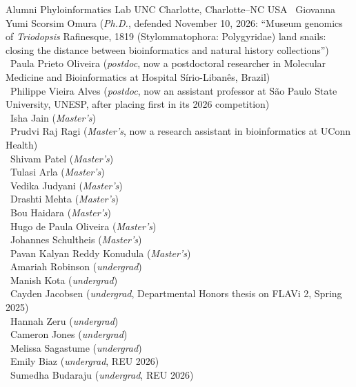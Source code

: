 \documentclass[11pt, letterpaper, sans]{moderncv}
\begin{document}
    {Alumni}
    {Phyloinformatics Lab}
    {UNC Charlotte, Charlotte--NC}
    {USA}
        {
            \textbullet~Giovanna Yumi Scorsim Omura (\textit{Ph.D.}, defended November 10, 2026: ``Museum genomics of \textit{Triodopsis} Rafinesque, 1819 (Stylommatophora: Polygyridae) land snails: closing the distance between bioinformatics and natural history collections'')\\
            \textbullet~Paula Prieto Oliveira (\textit{postdoc}, now a postdoctoral researcher in Molecular Medicine and Bioinformatics at Hospital Sírio-Libanês, Brazil)\\
            \textbullet~Philippe Vieira Alves (\textit{postdoc}, now an assistant professor at São Paulo State University, UNESP, after placing first in its 2026 competition)\\
            \textbullet~Isha Jain (\textit{Master's})\\
            \textbullet~Prudvi Raj Ragi (\textit{Master's}, now a research assistant in bioinformatics at UConn Health)\\
            \textbullet~Shivam Patel (\textit{Master's})\\
            \textbullet~Tulasi Arla (\textit{Master's})\\
            \textbullet~Vedika Judyani (\textit{Master's})\\
            \textbullet~Drashti Mehta (\textit{Master's})\\
            \textbullet~Bou Haidara (\textit{Master's})\\
            \textbullet~Hugo de Paula Oliveira (\textit{Master's})\\
            \textbullet~Johannes Schultheis (\textit{Master's})\\
            \textbullet~Pavan Kalyan Reddy Konudula (\textit{Master's})\\
            \textbullet~Amariah Robinson (\textit{undergrad})\\
            \textbullet~Manish Kota (\textit{undergrad})\\
            \textbullet~Cayden Jacobsen (\textit{undergrad}, Departmental Honors thesis on FLAVi 2, Spring 2025)\\
            \textbullet~Hannah Zeru (\textit{undergrad})\\
            \textbullet~Cameron Jones (\textit{undergrad})\\
            \textbullet~Melissa Sagastume (\textit{undergrad})\\
            \textbullet~Emily Biaz (\textit{undergrad}, REU 2026)\\
            \textbullet~Sumedha Budaraju (\textit{undergrad}, REU 2026)\\
        }
\end{document}
